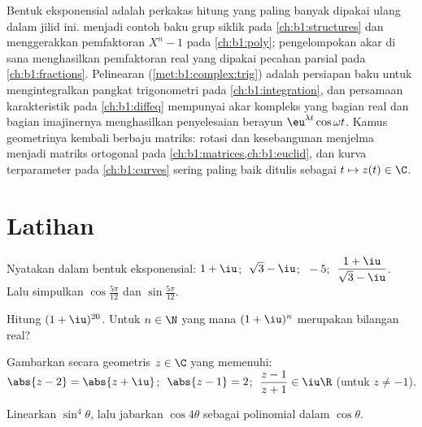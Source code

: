 \begin{remark}\label{rem:b1:complex:whereused}
Bentuk eksponensial adalah perkakas hitung yang paling banyak dipakai ulang
dalam jilid ini.  menjadi contoh baku grup
siklik pada \cref{ch:b1:structures} dan menggerakkan pemfaktoran
$X^n - 1$ pada \cref{ch:b1:poly}; pengelompokan akar  di sana
menghasilkan pemfaktoran real yang dipakai pecahan parsial pada
\cref{ch:b1:fractions}. Pelinearan (\cref{met:b1:complex:trig})
adalah persiapan baku untuk mengintegralkan pangkat trigonometri pada
\cref{ch:b1:integration}, dan persamaan karakteristik pada
\cref{ch:b1:diffeq} mempunyai akar kompleks yang bagian real dan
bagian imajinernya menghasilkan penyelesaian berayun $\eu^{\lambda t}\cos\omega
t$. Kamus geometrinya kembali berbaju matriks: rotasi
dan kesebangunan menjelma menjadi matriks ortogonal pada
\cref{ch:b1:matrices,ch:b1:euclid}, dan kurva terparameter pada
\cref{ch:b1:curves} sering paling baik ditulis sebagai  $t \mapsto z(t)
\in \C$.
\end{remark}

\section{Latihan}

\begin{exercise}[$\star$]\label{exo:b1:complex:1}
Nyatakan dalam bentuk eksponensial: $1 + \iu$; $\;\sqrt 3 - \iu$; $\;-5$;
$\;\dfrac{1 + \iu}{\sqrt 3 - \iu}$. Lalu simpulkan
$\cos\frac{5\pi}{12}$ dan $\sin\frac{5\pi}{12}$.
\end{exercise}

\begin{exercise}[$\star$]\label{exo:b1:complex:2}
Hitung $(1 + \iu)^{20}$. Untuk $n \in \N$ yang mana $(1 + \iu)^n$ merupakan
bilangan real?
\end{exercise}

\begin{exercise}[$\star$]\label{exo:b1:complex:3}
Gambarkan secara geometris  $z \in \C$ yang memenuhi:
$\abs{z - 2} = \abs{z + \iu}$; $\;\abs{z - 1} = 2$;
$\;\dfrac{z - 1}{z + 1} \in \iu\R$ (untuk $z \neq -1$).
\end{exercise}

\begin{exercise}[$\star$]\label{exo:b1:complex:4}
Linearkan $\sin^4\theta$, lalu jabarkan $\cos 4\theta$ sebagai polinomial dalam
$\cos\theta$.
\end{exercise}

